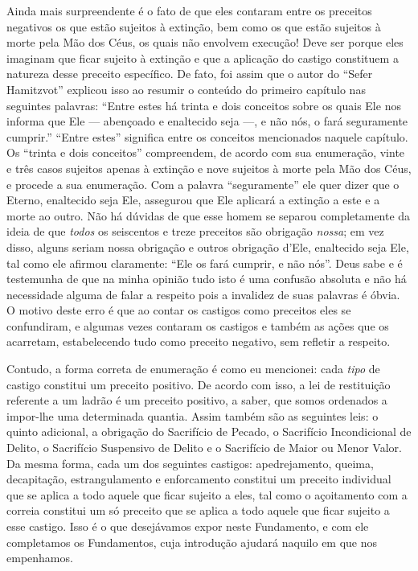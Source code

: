 Ainda mais surpreendente é o fato de que eles contaram entre os
preceitos negativos os que estão sujeitos à extinção, bem como os que
estão sujeitos à morte pela Mão dos Céus, os quais não envolvem
execução! Deve ser porque eles imaginam que ficar sujeito à extinção e
que a aplicação do castigo constituem a natureza desse preceito
específico. De fato, foi assim que o autor do ``Sefer Hamitzvot''
explicou isso ao resumir o conteúdo do primeiro capítulo nas seguintes
palavras: ``Entre estes há trinta e dois conceitos sobre os quais Ele
nos informa que Ele --- abençoado e enaltecido seja ---, e não nós, o
fará seguramente cumprir.'' ``Entre estes'' significa entre os conceitos
mencionados naquele capítulo. Os ``trinta e dois conceitos''
compreendem, de acordo com sua enumeração, vinte e três casos sujeitos
apenas à extinção e nove sujeitos à morte pela Mão dos Céus, e procede a
sua enumeração. Com a palavra ``seguramente'' ele quer dizer que o
Eterno, enaltecido seja Ele, assegurou que Ele aplicará a extinção a
este e a morte ao outro. Não há dúvidas de que esse homem se separou
completamente da ideia de que \emph{todos} os seiscentos e treze
preceitos são obrigação \emph{nossa}; em vez disso, alguns seriam nossa
obrigação e outros obrigação d'Ele, enaltecido seja Ele, tal como ele
afirmou claramente: ``Ele os fará cumprir, e não nós''. Deus sabe e é
testemunha de que na minha opinião tudo isto é uma confusão absoluta e
não há necessidade alguma de falar a respeito pois a invalidez de suas
palavras é óbvia. O motivo deste erro é que ao contar os castigos como
preceitos eles se confundiram, e algumas vezes contaram os castigos e
também as ações que os acarretam, estabelecendo tudo como preceito
negativo, sem refletir a respeito.

Contudo, a forma correta de enumeração é como eu mencionei: cada
\emph{tipo} de castigo constitui um preceito positivo. De acordo com
isso, a lei de restituição referente a um ladrão é um preceito positivo,
a saber, que somos ordenados a impor-lhe uma determinada quantia. Assim
também são as seguintes leis: o quinto adicional, a obrigação do
Sacrifício de Pecado, o Sacrifício
Incondicional de Delito, o Sacrifício Suspensivo de Delito e o
Sacrifício de Maior ou Menor Valor. Da mesma forma, cada um dos
seguintes castigos: apedrejamento, queima, decapitação, estrangulamento
e enforcamento constitui um preceito individual que se aplica a todo
aquele que ficar sujeito a eles, tal como o açoitamento com a correia
constitui um só preceito que se aplica a todo aquele que ficar sujeito a
esse castigo. Isso é o que desejávamos expor neste Fundamento, e com
ele completamos os Fundamentos, cuja introdução ajudará naquilo em que
nos empenhamos.

